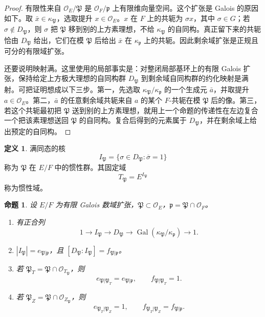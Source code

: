 \documentclass[11pt,a4paper,openany]{ctexbook}
\numberwithin{equation}{chapter}
\newcommand{\OF}{\mathcal{O}_F}
\newcommand{\Gal}{\operatorname{Gal}}
\theoremstyle{plain}
\newtheorem{proposition}[theorem]{命题}
\theoremstyle{definition}
\newtheorem{definition}[theorem]{定义}
\theoremstyle{remark}
\begin{document}
\begin{proof}
有限性来自 $\mathcal O_E/\mathfrak P$ 是 $\OF/\mathfrak p$ 上有限维向量空间。这个扩张是
Galois 的原因如下。取 $\bar x\in\kappa_{\mathfrak P}$，选取提升
$x\in\mathcal O_E$。$x$ 在 $F$ 上的共轭为 $\sigma x$，其中 $\sigma\in G$；若
$\sigma\notin D_{\mathfrak P}$，则 $\sigma$ 把 $\mathfrak P$ 移到别的上方素理想，不给
$\kappa_{\mathfrak P}$ 的自同构。真正留下来的共轭恰由 $D_{\mathfrak P}$ 给出，它们在模
$\mathfrak P$ 后给出 $\bar x$ 在 $\kappa_{\mathfrak p}$ 上的共轭。因此剩余域扩张是正规且可分的有限域扩张。

还要说明映射满。这里使用的局部事实是：对整闭局部基环上的有限 Galois 扩张，保持给定上方极大理想的自同构群
$D_{\mathfrak P}$ 到剩余域自同构群的约化映射是满射。可把证明想成以下三步。第一，先选取
$\kappa_{\mathfrak P}/\kappa_{\mathfrak p}$ 的一个生成元 $\bar a$，并取提升
$a\in\mathcal O_E$。第二，$\bar a$ 的任意剩余域共轭来自 $a$ 的某个
$F$-共轭在模 $\mathfrak P$ 后的像。第三，若这个共轭最初把 $\mathfrak P$ 送到别的上方素理想，就用上一个命题的传递性在左边复合一个把该素理想送回
$\mathfrak P$ 的自同构。复合后得到的元素属于 $D_{\mathfrak P}$，并在剩余域上给出预定的自同构。
\end{proof}

\begin{definition}
满同态的核
\[
I_{\mathfrak P}=\{\sigma\in D_{\mathfrak P}:\overline\sigma=1\}
\]
称为 $\mathfrak P$ 在 $E/F$ 中的惯性群。其固定域
\[
T_{\mathfrak P}=E^{I_{\mathfrak P}}
\]
称为惯性域。
\end{definition}

\begin{proposition}
设 $E/F$ 为有限 Galois 数域扩张，$\mathfrak P\subset\mathcal O_E$，$\mathfrak p=\mathfrak P\cap\OF$。
\begin{enumerate}[label=(\arabic*)]
\item 有正合列
\[
1\longrightarrow I_{\mathfrak P}\longrightarrow
D_{\mathfrak P}\longrightarrow
\Gal(\kappa_{\mathfrak P}/\kappa_{\mathfrak p})
\longrightarrow1.
\]
\item $|I_{\mathfrak P}|=e_{\mathfrak P|\mathfrak p}$，且 $[D_{\mathfrak P}:I_{\mathfrak P}]=f_{\mathfrak P|\mathfrak p}$。
\item 若 $\mathfrak P_T=\mathfrak P\cap\mathcal O_{T_{\mathfrak P}}$，则
\[
e_{\mathfrak P|\mathfrak P_T}=e_{\mathfrak P|\mathfrak p},\qquad
f_{\mathfrak P|\mathfrak P_T}=1.
\]
\item 若 $\mathfrak P_Z=\mathfrak P\cap\mathcal O_{Z_{\mathfrak P}}$，则
\[
e_{\mathfrak P_T|\mathfrak P_Z}=1,\qquad
f_{\mathfrak P_T|\mathfrak P_Z}=f_{\mathfrak P|\mathfrak p}.
\]
\end{enumerate}
\end{proposition}
\end{document}
